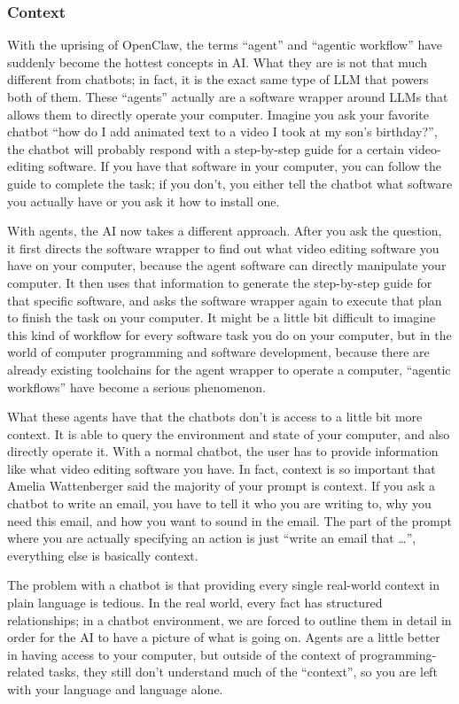 \documentclass[12pt]{article}
\begin{document}
\subsubsection{Context}
With the uprising of OpenClaw, the terms ``agent'' and ``agentic workflow'' have suddenly become the hottest concepts in AI. What they are is not that much different from chatbots; in fact, it is the exact same type of LLM that powers both of them. These ``agents'' actually are a software wrapper around LLMs that allows them to directly operate your computer. Imagine you ask your favorite chatbot ``how do I add animated text to a video I took at my son's birthday?'', the chatbot will probably respond with a step-by-step guide for a certain video-editing software. If you have that software in your computer, you can follow the guide to complete the task; if you don't, you either tell the chatbot what software you actually have or you ask it how to install one.

With agents, the AI now takes a different approach. After you ask the question, it first directs the software wrapper to find out what video editing software you have on your computer, because the agent software can directly manipulate your computer. It then uses that information to generate the step-by-step guide for that specific software, and asks the software wrapper again to execute that plan to finish the task on your computer. It might be a little bit difficult to imagine this kind of workflow for every software task you do on your computer, but in the world of computer programming and software development, because there are already existing toolchains for the agent wrapper to operate a computer, ``agentic workflows'' have become a serious phenomenon.

What these agents have that the chatbots don't is access to a little bit more context. It is able to query the environment and state of your computer, and also directly operate it. With a normal chatbot, the user has to provide information like what video editing software you have. In fact, context is so important that Amelia Wattenberger said the majority of your prompt is context. If you ask a chatbot to write an email, you have to tell it who you are writing to, why you need this email, and how you want to sound in the email. The part of the prompt where you are actually specifying an action is just ``write an email that …'', everything else is basically context.

The problem with a chatbot is that providing every single real-world context in plain language is tedious. In the real world, every fact has structured relationships; in a chatbot environment, we are forced to outline them in detail in order for the AI to have a picture of what is going on. Agents are a little better in having access to your computer, but outside of the context of programming-related tasks, they still don't understand much of the ``context'', so you are left with your language and language alone.
\end{document}
